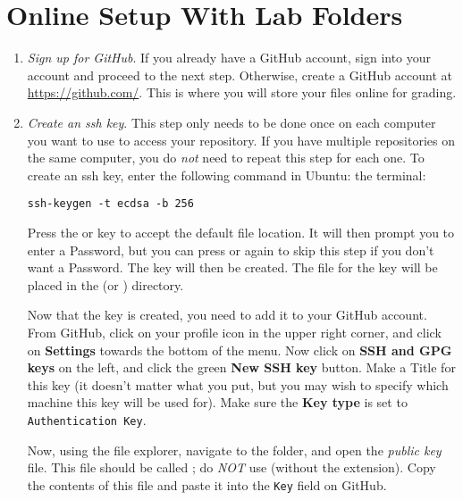 \section*{Online Setup With Lab Folders}
\begin{enumerate}
    \item \emph{Sign up for GitHub}.
    \label{step:sign-up}
    If you already have a GitHub account, sign into your account and proceed to the next step.
    Otherwise, create a GitHub account at \url{https://github.com/}.
    This is where you will store your files online for grading.
  
    \item \emph{Create an ssh key}.
    This step only needs to be done once on each computer you want to use to access your repository.
    If you have multiple repositories on the same computer, you do \emph{not} need to repeat this step for each one.
    To create an ssh key, enter the following command in
    \ifwindows
    Ubuntu:
    \else
    the terminal:
    \fi
\begin{lstlisting}
ssh-keygen -t ecdsa -b 256
\end{lstlisting}
    Press the  or  key to accept the default file location.
    It will then prompt you to enter a Password, but you can press  or  again to skip this step if you don't want a Password.
    The key will then be created.
    The file for the key will be placed in the  (or ) directory.
  
    Now that the key is created, you need to add it to your GitHub account.
    From GitHub, click on your profile icon in the upper right corner, and click on \textbf{Settings} towards the bottom of the menu.
    Now click on \textbf{SSH and GPG keys} on the left, and click the green \textbf{New SSH key} button.
    Make a Title for this key (it doesn't matter what you put, but you may wish to specify which machine this key will be used for).
    Make sure the \textbf{Key type} is set to \texttt{Authentication Key}.

    Now, using the file explorer, navigate to the  folder, and open the \emph{public key} file.
    This file should be called ; do \emph{NOT} use  (without the  extension).
    Copy the contents of this file and paste it into the \texttt{Key} field on GitHub. 


\end{enumerate}
